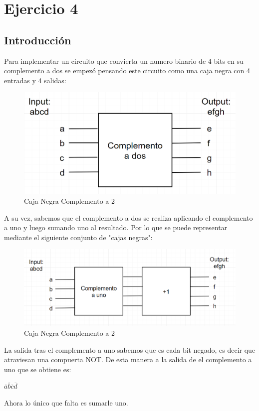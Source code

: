 \documentclass{article}
\begin{document}
	
	\section{Ejercicio 4}
	\subsection{Introducción}
		\hspace{10mm} Para implementar un circuito que convierta un numero binario de 4 bits en su complemento a dos se empezó pensando este circuito como una caja negra con 4 entradas y 4 salidas:
		\begin{figure}[h!]
			\includegraphics[width=\linewidth,scale=0.5]{comp2.png}
  			\caption{Caja Negra Complemento a 2}
		\end{figure}
		\newline \hspace{10mm} A su vez, sabemos que el complemento a dos se realiza aplicando el complemento a uno y luego sumando uno al resultado. Por lo que se puede representar mediante el siguiente conjunto de "cajas negras":
		\begin{figure}[h!]
			\includegraphics[width=\linewidth,scale=0.5]{comp1+1.png}
  			\caption{Caja Negra Complemento a 2}
		\end{figure}
		\newline \hspace{10mm} La salida tras el complemento a uno sabemos que es cada bit negado, es decir que atraviesan una compuerta NOT. De esta manera a la salida de el complemento a uno que se obtiene es: 
		\newline \centerline{$\overline{a} \overline{b} \overline{c} \overline{d}$} 
		\hspace{10mm} Ahora lo único que falta es sumarle uno.
\end{document}
